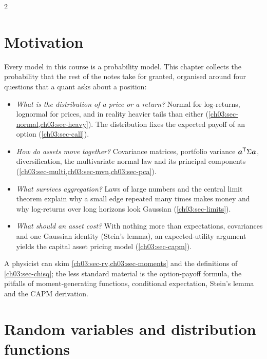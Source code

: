 \begin{paracol}{2}
\section*{Motivation}
Every model in this course is a probability model. This chapter collects the probability that the
rest of the notes take for granted, organised around four questions that a quant asks about a
position:
\begin{itemize}
  \item \emph{What is the distribution of a price or a return?} Normal for log-returns, lognormal
        for prices, and in reality heavier tails than either (\cref{ch03:sec-normal,ch03:sec-heavy}).
        The distribution fixes the expected payoff of an option (\cref{ch03:sec-call}).
  \item \emph{How do assets move together?} Covariance matrices, portfolio variance $\bm a^{\mathsf T}\Sigma\bm a$,
        diversification, the multivariate normal law and its principal components
        (\cref{ch03:sec-multi,ch03:sec-mvn,ch03:sec-pca}).
  \item \emph{What survives aggregation?} Laws of large numbers and the central limit theorem explain
        why a small edge repeated many times makes money and why log-returns over long horizons look
        Gaussian (\cref{ch03:sec-limits}).
  \item \emph{What should an asset cost?} With nothing more than expectations, covariances and one
        Gaussian identity (Stein's lemma), an expected-utility argument yields the capital asset
        pricing model (\cref{ch03:sec-capm}).
\end{itemize}
A physicist can skim \cref{ch03:sec-rv,ch03:sec-moments} and the definitions of
\cref{ch03:sec-chisq}; the less standard material is the option-payoff formula, the pitfalls of
moment-generating functions, conditional expectation, Stein's lemma and the CAPM derivation.

\clearpage\section{Random variables and distribution functions}\label{ch03:sec-rv}


\end{paracol}
